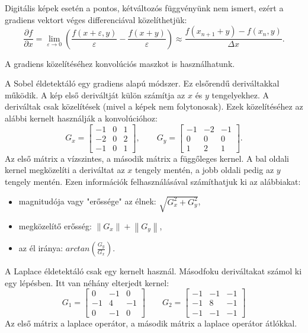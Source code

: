 Digitális képek esetén a pontos, kétváltozós függvényünk nem ismert, ezért a gradiens vektort véges differenciával közelíthetjük:
$$
\frac{\partial f}{\partial x} =
\lim_{\varepsilon \to 0} \left(
\frac{f(x+\varepsilon,y)}{\varepsilon}-\frac{f(x+y)}{\varepsilon}
\right) \approx
\frac{f(x_{n+1}+y)-f(x_n,y)}{\Delta x}.
$$

A gradiens közelítéséhez konvolúciós maszkot is használhatunk.




A Sobel éldetektáló egy gradiens alapú módszer. Ez elsőrendű deriváltakkal működik. A kép első deriváltját külön számítja az $x$ és $y$ tengelyekhez. A deriváltak csak közelítések (mivel a képek nem folytonosak). Ezek közelítéséhez az alábbi kernelt használják a konvolúcióhoz:
$$
G_x =
\begin{bmatrix}
-1&0  &1 \\ 
-2&0  &2 \\ 
-1&0  &1 
\end{bmatrix},
\qquad
G_y =
\begin{bmatrix}
-1&-2  &-1 \\ 
0&0  &0 \\ 
1&2  &1 
\end{bmatrix}.
$$
Az első mátrix a vízszintes, a második mátrix a függőleges kernel. A bal oldali kernel megközelíti a deriváltat az $x$ tengely mentén, a jobb oldali pedig az $y$ tengely mentén. Ezen információk felhasználásával számíthatjuk ki az alábbiakat:
\begin{itemize}
\item magnitudója vagy "erőssége" az élnek: $\sqrt{G_{x}^{2}+G_{y}^{2}}$,
\item megközelítő erősség: $ \left\| G_x \right \| + \left\| G_y \right \|$,
\item az él iránya: $arctan\left(\frac{G_y}{G_x}\right)$.
\end{itemize}



A Laplace éldetektáló csak egy kernelt használ. Másodfoku deriváltakat számol ki egy lépésben. Itt van néhány elterjedt kernel:
$$
G_1 =
\begin{bmatrix}
 0 & -1  & 0 \\ 
-1 &  4  &-1 \\ 
 0 & -1  & 0 
\end{bmatrix} 
\qquad
G_2 =
\begin{bmatrix}
-1 & -1 & -1 \\ 
-1 &  8 & -1 \\ 
-1 & -1 & -1 
\end{bmatrix}
$$
Az első mátrix a laplace operátor, a második mátrix a laplace operátor átlókkal.

